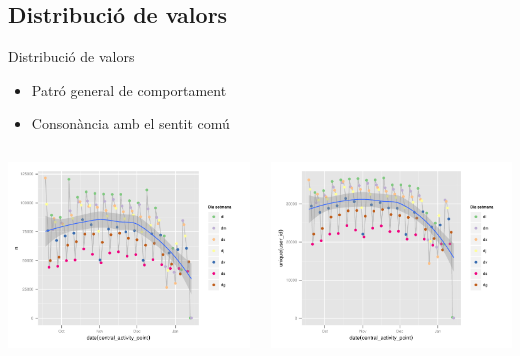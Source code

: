 \documentclass[xcolor=x11names,
								compress,
								aspectratio=1610]{beamer}
\theoremstyle{definition}%
\renewcommand{\(}{\begin{columns}}
\renewcommand{\)}{\end{columns}}
\newcommand{\<}[1]{\begin{column}{#1}}
\renewcommand{\>}{\end{column}}
\begin{document}
	\subsection{Distribució de valors}
	\begin{frame}{Distribució de valors}
	\begin{itemize}
		\item Patró general de comportament
		\item Consonància amb el sentit comú
	\end{itemize}
	\begin{columns}[onlytextwidth]
		\begin{column}{.5\textwidth}
		\includegraphics[width = \textwidth]{n_sessions_pday_scatter}
		\end{column}
		\begin{column}{.5\textwidth}
		\includegraphics[width = \textwidth]{n_users_pday_scatter}
		\end{column}
	\end{columns}
	\end{frame}
	
\end{document}
